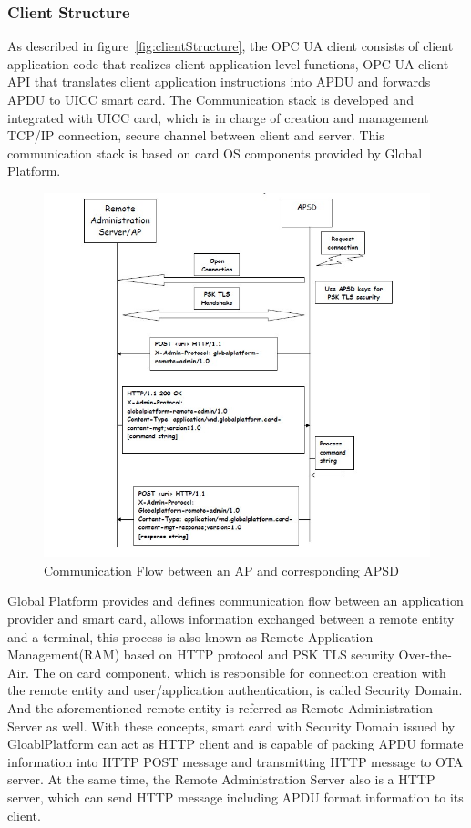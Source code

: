 \documentclass[]{llncs}
\begin{document}
\subsubsection{Client Structure}
As described in figure~\ref{fig:clientStructure}, the OPC UA client consists of client application code that realizes client application level functions, OPC UA client API that translates client application instructions into APDU and forwards APDU to UICC smart card. The Communication stack is developed and integrated with UICC card, which is in charge of creation and management TCP/IP connection, secure channel between client and server. This communication stack is based on card OS components provided by Global Platform. 
\begin{figure}
	\centering
	\includegraphics[width=1.2\textwidth]{apsd.jpg}
		\caption[ ]{Communication Flow between an AP and corresponding APSD\cite{ramGP}}
	\label{fig:apsd}
\end{figure}
Global Platform provides and defines communication flow between an application provider and smart card, allows information exchanged between a remote entity and a terminal, this process is also known as  Remote Application Management(RAM) based on HTTP protocol and PSK TLS security Over-the-Air. The on card component, which is responsible for connection creation with the remote entity and user/application authentication, is called Security Domain. And the aforementioned remote entity  is  referred as Remote Administration Server as well. With these concepts, smart card with Security Domain issued  by GloablPlatform can act as HTTP client and is capable of packing APDU formate information into HTTP POST message and transmitting HTTP message to OTA server. At the same time, the Remote Administration Server also is a HTTP server, which can send HTTP message including APDU format information to its client.\cite{ramGP}
 
\end{document}
